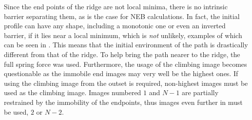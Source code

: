 Since the end points of the ridge are not local minima, there is no intrinsic barrier separating them, as is the case for NEB calculations.
In fact, the initial profile can have any shape, including a monotonic one or even an inverted barrier, if it lies near a local minimum, which is \emph{not} unlikely, examples of which can be seen in .
This means that the initial environment of the path is drastically different from that of the ridge.
To help bring the path nearer to the ridge, the full spring force was used.
Furthermore, the usage of the climbing image becomes questionable as the immobile end images may very well be the highest ones.
If using the climbing image from the outset is required, non-highest images must be used as the climbing image.
Images numbered $1$ and $N-1$ are partially restrained by the immobility of the endpoints, thus images even further in must be used, $2$ or $N-2$.

